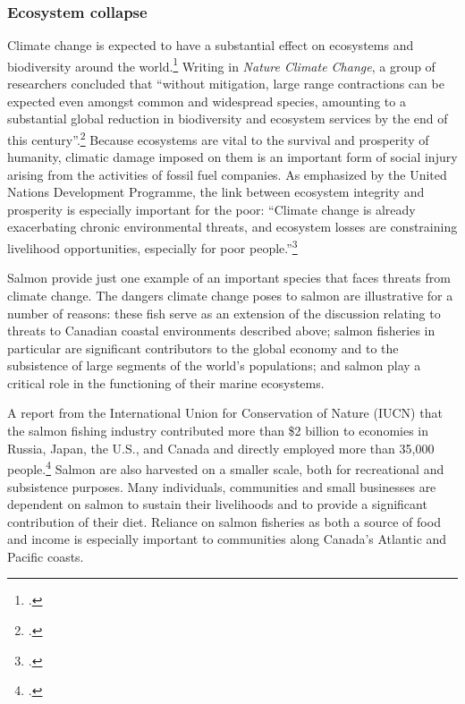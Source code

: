 	\subsubsection{Ecosystem collapse}



Climate change is expected to have a substantial effect on ecosystems and biodiversity around the world.\footcite[][p. 1]{VulnerableSpecies}
Writing in \emph{Nature Climate Change}, a group of researchers concluded that ``without mitigation, large range contractions can be expected even amongst common and widespread species, amounting to a substantial global reduction in biodiversity and ecosystem services by the end of this century''.\footcite[][p. 1]{WarrenBiodiversity}
Because ecosystems are vital to the survival and prosperity of humanity, climatic damage imposed on them is an important form of social injury arising from the activities of fossil fuel companies.
As emphasized by the United Nations Development Programme, the link between ecosystem integrity and prosperity is especially important for the poor: ``Climate change is already exacerbating chronic environmental threats, and ecosystem losses are constraining livelihood opportunities, especially for poor people.''\footcite[][p. 95]{UNHumanDev2013}



Salmon provide just one example of an important species that faces threats from climate change. 
The dangers climate change poses to salmon are illustrative for a number of reasons: these fish serve as an extension of the discussion relating to threats to Canadian coastal environments described above; salmon fisheries in particular are significant contributors to the global economy and to the subsistence of large segments of the world’s populations; and salmon play a critical role in the functioning of their marine ecosystems.



A report from the International Union for Conservation of Nature (IUCN) that the salmon fishing industry contributed more than \$2 billion to economies in Russia, Japan, the U.S., and Canada and directly employed more than 35,000 people.\footcite[][p. 2]{IUCNSalmon}
Salmon are also harvested on a smaller scale, both for recreational and subsistence purposes.
Many individuals, communities and small businesses are dependent on salmon to sustain their livelihoods and to provide a significant contribution of their diet. 
Reliance on salmon fisheries as both a source of food and income is especially important to communities along Canada's Atlantic and Pacific coasts. 


